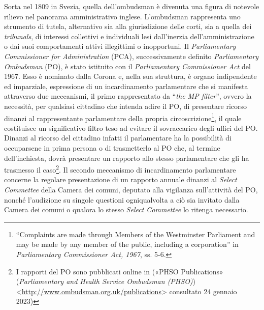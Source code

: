\documentclass[12pt,it,a4paper,]{report}
\begin{document}
Sorta nel 1809 in Svezia, quella dell'ombudsman è divenuta una figura di
notevole rilievo nel panorama amministrativo inglese. L'ombudsman
rappresenta uno strumento di tutela, alternativo sia alla giurisdizione
delle corti, sia a quella dei \emph{tribunals}, di interessi collettivi
e individuali lesi dall'inerzia dell'amministrazione o dai suoi
comportamenti attivi illegittimi o inopportuni. Il \emph{Parliamentary
Commissioner for Administration} (PCA), successivamente definito
\emph{Parliamentary Ombudsman} (PO), è stato istituito con il
\emph{Parliamentary Commissioner Act} del 1967. Esso è nominato dalla
Corona e, nella sua struttura, è organo indipendente ed imparziale,
espressione di un incardinamento parlamentare che si manifesta
attraverso due meccanismi, il primo rappresentato da ``\emph{the MP
filter}'', ovvero la necessità, per qualsiasi cittadino che intenda
adire il PO, di presentare ricorso dinanzi al rappresentante
parlamentare della propria circoscrizione\footnote{``Complaints are made
  through Members of the Westminster Parliament and may be made by any
  member of the public, including a corporation'' in \emph{Parliamentary
  Commissioner Act, 1967}, ss. 5-6.}, il quale costituisce un
significativo filtro teso ad evitare il sovraccarico degli uffici del
PO. Dinanzi al ricorso del cittadino infatti il parlamentare ha la
possibilità di occuparsene in prima persona o di trasmetterlo al PO che,
al termine dell'inchiesta, dovrà presentare un rapporto allo stesso
parlamentare che gli ha trasmesso il caso\footnote{I rapporti del PO
  sono pubblicati online in ({«PHSO Publications»} (\emph{Parliamentary
  and Health Service Ombudsman (PHSO)})
  \textless{}\url{http://www.ombudsman.org.uk/publications}\textgreater{}
  consultato 24 gennaio 2023)}. Il secondo meccanismo di incardinamento
parlamentare concerne la regolare presentazione di un rapporto annuale
dinanzi al \emph{Select Commettee} della Camera dei comuni, deputato
alla vigilanza sull'attività del PO, nonché l'audizione su singole
questioni ogniqualvolta a ciò sia invitato dalla Camera dei comuni o
qualora lo stesso \emph{Select Commettee} lo ritenga necessario.
\end{document}
